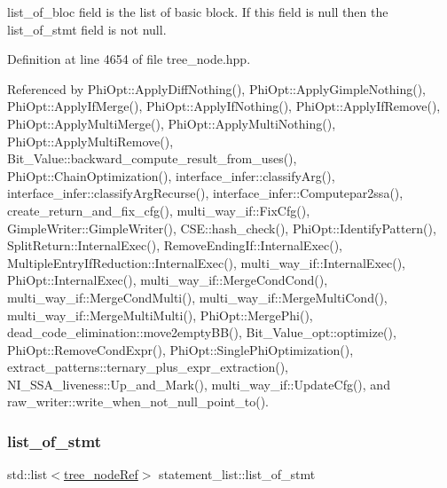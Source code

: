 list\+\_\+of\+\_\+bloc field is the list of basic block. If this field is null then the list\+\_\+of\+\_\+stmt field is not null. 



Definition at line 4654 of file tree\+\_\+node.\+hpp.



Referenced by Phi\+Opt\+::\+Apply\+Diff\+Nothing(), Phi\+Opt\+::\+Apply\+Gimple\+Nothing(), Phi\+Opt\+::\+Apply\+If\+Merge(), Phi\+Opt\+::\+Apply\+If\+Nothing(), Phi\+Opt\+::\+Apply\+If\+Remove(), Phi\+Opt\+::\+Apply\+Multi\+Merge(), Phi\+Opt\+::\+Apply\+Multi\+Nothing(), Phi\+Opt\+::\+Apply\+Multi\+Remove(), Bit\+\_\+\+Value\+::backward\+\_\+compute\+\_\+result\+\_\+from\+\_\+uses(), Phi\+Opt\+::\+Chain\+Optimization(), interface\+\_\+infer\+::classify\+Arg(), interface\+\_\+infer\+::classify\+Arg\+Recurse(), interface\+\_\+infer\+::\+Computepar2ssa(), create\+\_\+return\+\_\+and\+\_\+fix\+\_\+cfg(), multi\+\_\+way\+\_\+if\+::\+Fix\+Cfg(), Gimple\+Writer\+::\+Gimple\+Writer(), C\+S\+E\+::hash\+\_\+check(), Phi\+Opt\+::\+Identify\+Pattern(), Split\+Return\+::\+Internal\+Exec(), Remove\+Ending\+If\+::\+Internal\+Exec(), Multiple\+Entry\+If\+Reduction\+::\+Internal\+Exec(), multi\+\_\+way\+\_\+if\+::\+Internal\+Exec(), Phi\+Opt\+::\+Internal\+Exec(), multi\+\_\+way\+\_\+if\+::\+Merge\+Cond\+Cond(), multi\+\_\+way\+\_\+if\+::\+Merge\+Cond\+Multi(), multi\+\_\+way\+\_\+if\+::\+Merge\+Multi\+Cond(), multi\+\_\+way\+\_\+if\+::\+Merge\+Multi\+Multi(), Phi\+Opt\+::\+Merge\+Phi(), dead\+\_\+code\+\_\+elimination\+::move2empty\+B\+B(), Bit\+\_\+\+Value\+\_\+opt\+::optimize(), Phi\+Opt\+::\+Remove\+Cond\+Expr(), Phi\+Opt\+::\+Single\+Phi\+Optimization(), extract\+\_\+patterns\+::ternary\+\_\+plus\+\_\+expr\+\_\+extraction(), N\+I\+\_\+\+S\+S\+A\+\_\+liveness\+::\+Up\+\_\+and\+\_\+\+Mark(), multi\+\_\+way\+\_\+if\+::\+Update\+Cfg(), and raw\+\_\+writer\+::write\+\_\+when\+\_\+not\+\_\+null\+\_\+point\+\_\+to().

\mbox{\label{structstatement__list_a28140056133e331a78154933e1f2bee5}} 
\subsubsection{\texorpdfstring{list\+\_\+of\+\_\+stmt}{list\_of\_stmt}}
{\footnotesize\ttfamily std\+::list$<$\hyperlink{tree__node_8hpp_a6ee377554d1c4871ad66a337eaa67fd5}{tree\+\_\+node\+Ref}$>$ statement\+\_\+list\+::list\+\_\+of\+\_\+stmt}



